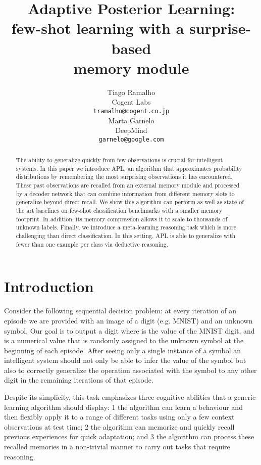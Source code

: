 \documentclass{article} \usepackage{iclr2019_conference,times}
\title{Adaptive Posterior Learning: \\few-shot learning with a surprise-based \\ memory module}
\author{Tiago Ramalho \\
Cogent Labs \\
\texttt{tramalho@cogent.co.jp} \\
\And
Marta Garnelo \\
DeepMind \\
\texttt{garnelo@google.com} \\
}
\begin{document}
\maketitle

\begin{abstract}




The ability to generalize quickly from few observations is crucial for intelligent systems. In this paper we introduce APL, an algorithm that approximates probability distributions by remembering the most surprising observations it has encountered.
These past observations are recalled from an external memory module and  processed by a decoder network that can combine information from different memory slots to generalize beyond direct recall.
We show this algorithm can perform as well as state of the art baselines on few-shot classification benchmarks with a smaller memory footprint. 
In addition, its memory compression allows it to scale to thousands of unknown labels. 
Finally, we introduce a meta-learning reasoning task which is more challenging than direct classification. In this setting, APL is able to generalize with fewer than one example per class via deductive reasoning.
\end{abstract}

\section{Introduction}
Consider the following sequential decision problem: at every iteration of an episode we are provided with an image of a digit (e.g. MNIST) and an unknown symbol. Our goal is to output a digit  where  is the value of the MNIST digit, and  is a numerical value that is randomly assigned to the unknown symbol at the beginning of each episode. After seeing only a single instance of a symbol an intelligent system should not only be able to infer the value  of the symbol but also to correctly generalize the operation associated with the symbol to any other digit in the remaining iterations of that episode.

Despite its simplicity, this task emphasizes three cognitive abilities that a generic learning algorithm should display: 1 the algorithm can learn a behaviour and then flexibly apply it to a range of different tasks using only a few context observations at test time; 2 the algorithm can memorize and quickly recall previous experiences for quick adaptation; and 3 the algorithm can process these recalled memories in a non-trivial manner to carry out tasks that require reasoning.
\end{document}
